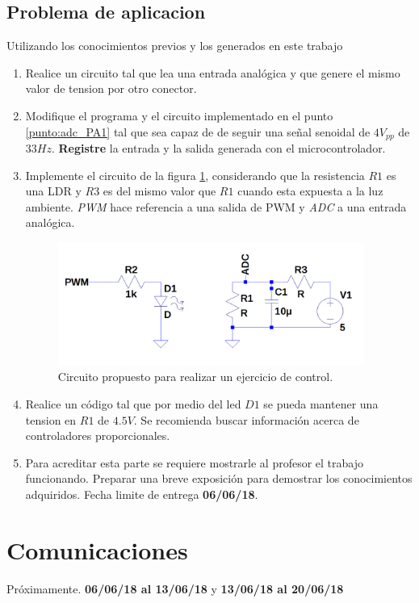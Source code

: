 \documentclass[10pt,conference,a4paper,onecolumn]{article}%
\begin{document}
\subsection{Problema de aplicacion}
Utilizando los conocimientos previos y los generados en este trabajo 
\begin{enumerate}
\item \label{punto:adc_PA1} Realice un circuito tal que lea una entrada analógica y que genere el mismo valor de tension por otro conector. 
\item Modifique el programa y el circuito implementado en el punto \ref{punto:adc_PA1} tal que sea capaz de de seguir una señal senoidal de $4V_{pp}$ de $33 Hz$. \textbf{Registre} la entrada y la salida generada con el microcontrolador.
\item Implemente el circuito de la figura \ref{fig:1}, considerando que la resistencia $R1$ es una LDR y $R3$ es del mismo valor que $R1$ cuando esta expuesta a la luz ambiente. \emph{PWM} hace referencia a una salida de PWM y \emph{ADC} a una entrada analógica.

\begin{figure}[h]
\centering
\includegraphics[width=10cm]{./imagenes/circuito_ldr.png}
\caption{Circuito propuesto para realizar un ejercicio de control.}
\label{fig:1}
\end{figure}

\item Realice un código tal que por medio del led $D1$ se pueda mantener una tension en $R1$ de $4.5V$. Se recomienda buscar información acerca de controladores proporcionales. 

\item Para acreditar esta parte se requiere mostrarle al profesor el trabajo funcionando. Preparar una breve exposición para demostrar los conocimientos adquiridos. Fecha limite de entrega \textbf{06/06/18}.
\end{enumerate}
\section{Comunicaciones}
Próximamente. \textbf{06/06/18 al 13/06/18} y \textbf{13/06/18 al 20/06/18}
%
%
%
\end{document}

